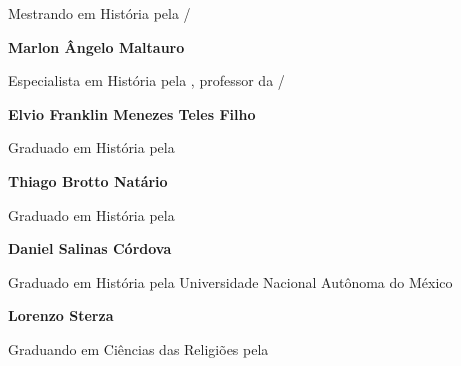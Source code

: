 Mestrando em História pela /
\medskip

\textbf{Marlon Ângelo Maltauro}

Especialista em História pela , professor da /
\medskip

\textbf{Elvio Franklin Menezes Teles Filho}

Graduado em História pela 
\medskip

\textbf{Thiago Brotto Natário}

Graduado em História pela 
\medskip

\textbf{Daniel Salinas Córdova}

Graduado em História pela Universidade Nacional Autônoma do México
\medskip

\textbf{Lorenzo Sterza}

Graduando em Ciências das Religiões pela 
\thispagestyle{empty}

\endgroup

